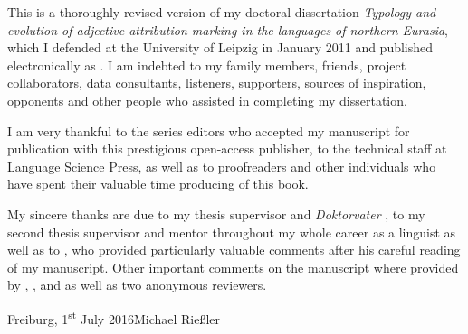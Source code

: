 

This is a thoroughly revised version of my doctoral dissertation \textit{Typology and evolution of adjective attribution marking in the languages of northern Eurasia}, which I defended at the University of Leipzig in January 2011 and published electronically as \citet{riesler2011a}. I am indebted to my family members, friends, project collaborators, data consultants, listeners, supporters, sources of inspiration, opponents and other people who assisted in completing my dissertation. 

I am very thankful to the series editors who accepted my manuscript for publication with this prestigious open-access publisher, to the technical staff at Language Science Press, as well as to proofreaders and other individuals who have spent their valuable time producing of this book. 

My sincere thanks are due to my thesis supervisor and \emph{Doktorvater} , to my second thesis supervisor and mentor throughout my whole career as a linguist  as well as to , who provided particularly valuable comments after his careful reading of my manuscript. Other important comments on the manuscript where provided by , ,  and  as well as two anonymous reviewers.

\bigskip

\noindent
Freiburg, 1\textsuperscript{st} July 2016\hfill Michael Rießler
